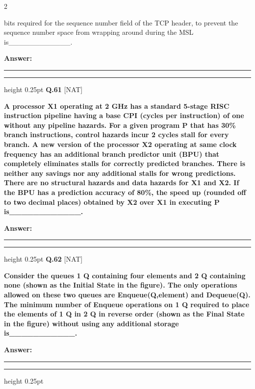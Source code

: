 \documentclass[a4paper,10pt,twoside]{article}
\begin{document}
\begin{multicols}{2}
{bits required for the sequence number field of the TCP header, to prevent the
sequence number space from wrapping around during the MSL is\_\_\_\_\_\_\_\_\_\_\_\_. \par}
\par\vspace{3pt}\noindent\textbf{Answer:} \rule{3.2cm}{0.4pt}
\par\vspace{6pt}\hrule height 0.25pt\vspace{6pt}
\noindent\textbf{Q.61} \hfill {\footnotesize\textsf{[NAT]}}
\par\vspace{2pt}
{\bfseries A processor X1 operating at 2 GHz has a standard 5-stage RISC instruction pipeline
having a base CPI (cycles per instruction) of one without any pipeline hazards.
For a given program P that has 30\% branch instructions, control hazards incur 2
cycles stall for every branch. A new version of the processor X2 operating at same
clock frequency has an additional branch predictor unit (BPU) that completely
eliminates stalls for correctly predicted branches. There is neither any savings nor
any additional stalls for wrong predictions. There are no structural hazards and data
hazards for X1 and X2. If the BPU has a prediction accuracy of 80\%, the speed up
(rounded off to two decimal places) obtained by X2 over X1 in executing
P is\_\_\_\_\_\_\_\_\_\_\_\_. \par}
\par\vspace{3pt}\noindent\textbf{Answer:} \rule{3.2cm}{0.4pt}
\par\vspace{6pt}\hrule height 0.25pt\vspace{6pt}
\noindent\textbf{Q.62} \hfill {\footnotesize\textsf{[NAT]}}
\par\vspace{2pt}
{\bfseries Consider the queues
1
Q containing four elements and
2
Q containing none (shown
as the Initial State in the figure). The only operations allowed on these two queues
are Enqueue(Q,element) and Dequeue(Q). The minimum number of
Enqueue operations on
1
Q required to place the elements of
1
Q in
2
Q in reverse
order (shown as the Final State in the figure) without using any additional storage
is\_\_\_\_\_\_\_\_\_\_\_. \par}
\par\vspace{3pt}\noindent\textbf{Answer:} \rule{3.2cm}{0.4pt}
\par\vspace{6pt}\hrule height 0.25pt\vspace{6pt}

\end{multicols}
\end{document}
